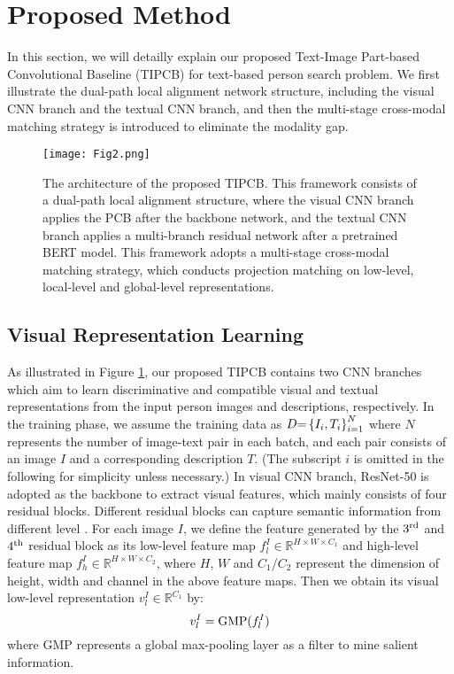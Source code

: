 \documentclass[review]{elsarticle}
\begin{document}
\section{Proposed Method}
In this section, we will detailly explain our proposed Text-Image Part-based Convolutional Baseline (TIPCB) for text-based person search problem. We first illustrate the dual-path local alignment network structure, including the visual CNN branch and the textual CNN branch, and then the multi-stage cross-modal matching strategy is introduced to eliminate the modality gap.

\begin{figure}[!t]
\centering
\texttt{[image: Fig2.png]}\\
\caption{The architecture of the proposed TIPCB. This framework consists of a dual-path local alignment structure, where the visual CNN branch applies the PCB after the backbone network, and the textual CNN branch applies a multi-branch residual network after a pretrained BERT model. This framework adopts a multi-stage cross-modal matching strategy, which conducts projection matching on low-level, local-level and global-level representations.}
\label{fig2}
\end{figure}

\subsection{Visual Representation Learning}
As illustrated in Figure \ref{fig2}, our proposed TIPCB contains two CNN branches which aim to learn discriminative and compatible visual and textual representations from the input person images and descriptions, respectively. In the training phase, we assume the training data as $D{\rm{ = }}\left\{ {{I_i},{T_i}} \right\}_{i = 1}^N$ where $N$ represents the number of image-text pair in each batch, and each pair consists of an image $I$ and a corresponding description $T$. (The subscript $i$ is omitted in the following for simplicity unless necessary.)
In visual CNN branch, ResNet-50 \cite{47} is adopted as the backbone to extract visual features, which mainly consists of four residual blocks. Different residual blocks can capture semantic information from different level \cite{48}. For each image $I$, we define the feature generated by the ${3^{{\rm{rd}}}}$ and ${4^{{\rm{th}}}}$ residual block as its low-level feature map $f_l^I \in {\mathbb{R}^{H \times W \times {C_1}}}$ and high-level feature map $f_h^I \in {\mathbb{R}^{H \times W \times {C_2}}}$, where $H$, $W$ and ${C_1}$/${C_2}$ represent the dimension of height, width and channel in the above feature maps. Then we obtain its visual low-level representation $v_l^I \in {\mathbb{R}^{{C_1}}}$ by:
\begin{equation}
    v_l^I = {\rm{GMP}}(f_l^I)
\label{f1}
\end{equation}
where GMP represents a global max-pooling layer as a filter to mine salient information. 
\end{document}
